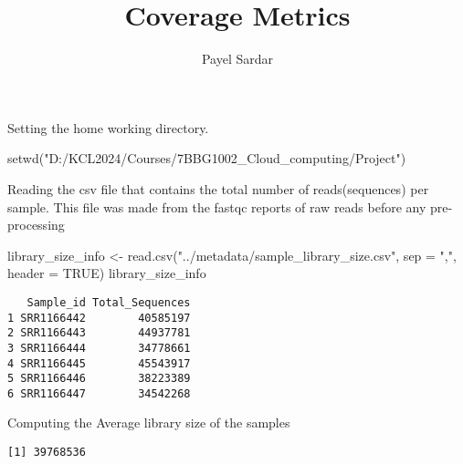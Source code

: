 \documentclass[
  letterpaper,
  DIV=11,
  numbers=noendperiod]{scrartcl}
\title{Coverage Metrics}
\author{Payel Sardar}
\date{}
\newenvironment{Shaded}{\begin{snugshade}}{\end{snugshade}}
\newcommand{\AttributeTok}[1]{\textcolor[rgb]{0.40,0.45,0.13}{#1}}
\newcommand{\ConstantTok}[1]{\textcolor[rgb]{0.56,0.35,0.01}{#1}}
\newcommand{\FunctionTok}[1]{\textcolor[rgb]{0.28,0.35,0.67}{#1}}
\newcommand{\NormalTok}[1]{\textcolor[rgb]{0.00,0.23,0.31}{#1}}
\newcommand{\OtherTok}[1]{\textcolor[rgb]{0.00,0.23,0.31}{#1}}
\newcommand{\SpecialCharTok}[1]{\textcolor[rgb]{0.37,0.37,0.37}{#1}}
\newcommand{\StringTok}[1]{\textcolor[rgb]{0.13,0.47,0.30}{#1}}
\begin{document}
\maketitle


Setting the home working directory.

\begin{Shaded}
\begin{Highlighting}[]
\FunctionTok{setwd}\NormalTok{(}\StringTok{"D:/KCL2024/Courses/7BBG1002\_Cloud\_computing/Project"}\NormalTok{)}
\end{Highlighting}
\end{Shaded}

Reading the csv file that contains the total number of reads(sequences)
per sample. This file was made from the fastqc reports of raw reads
before any pre-processing

\begin{Shaded}
\begin{Highlighting}[]
\NormalTok{library\_size\_info }\OtherTok{\textless{}{-}} \FunctionTok{read.csv}\NormalTok{(}\StringTok{"../metadata/sample\_library\_size.csv"}\NormalTok{, }
                              \AttributeTok{sep =} \StringTok{","}\NormalTok{, }\AttributeTok{header =} \ConstantTok{TRUE}\NormalTok{)}
\NormalTok{library\_size\_info}
\end{Highlighting}
\end{Shaded}

\begin{verbatim}
   Sample_id Total_Sequences
1 SRR1166442        40585197
2 SRR1166443        44937781
3 SRR1166444        34778661
4 SRR1166445        45543917
5 SRR1166446        38223389
6 SRR1166447        34542268
\end{verbatim}

Computing the Average library size of the samples

\begin{Shaded}
\end{Shaded}

\begin{verbatim}
[1] 39768536
\end{verbatim}
\end{document}
